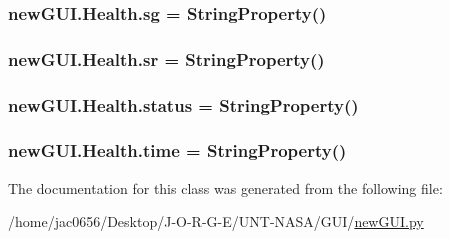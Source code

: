 \subsubsection[{\texorpdfstring{sg}{sg}}]{\setlength{\rightskip}{0pt plus 5cm}new\+G\+U\+I.\+Health.\+sg = String\+Property()\hspace{0.3cm}{\ttfamily [static]}}\hypertarget{classnewGUI_1_1Health_a2fbe00b219464fe2399a667b5007754b}{}\label{classnewGUI_1_1Health_a2fbe00b219464fe2399a667b5007754b}
\subsubsection[{\texorpdfstring{sr}{sr}}]{\setlength{\rightskip}{0pt plus 5cm}new\+G\+U\+I.\+Health.\+sr = String\+Property()\hspace{0.3cm}{\ttfamily [static]}}\hypertarget{classnewGUI_1_1Health_a65c3663c4c8d9cba367a6f44e93bf924}{}\label{classnewGUI_1_1Health_a65c3663c4c8d9cba367a6f44e93bf924}
\subsubsection[{\texorpdfstring{status}{status}}]{\setlength{\rightskip}{0pt plus 5cm}new\+G\+U\+I.\+Health.\+status = String\+Property()\hspace{0.3cm}{\ttfamily [static]}}\hypertarget{classnewGUI_1_1Health_aa449ef4c028f2046e2c0d124e6d0f2e6}{}\label{classnewGUI_1_1Health_aa449ef4c028f2046e2c0d124e6d0f2e6}
\subsubsection[{\texorpdfstring{time}{time}}]{\setlength{\rightskip}{0pt plus 5cm}new\+G\+U\+I.\+Health.\+time = String\+Property()\hspace{0.3cm}{\ttfamily [static]}}\hypertarget{classnewGUI_1_1Health_a93541d2a0ad79b7b74e07c738ede3e8e}{}\label{classnewGUI_1_1Health_a93541d2a0ad79b7b74e07c738ede3e8e}


The documentation for this class was generated from the following file\+:\begin{DoxyCompactItemize}
\item 
/home/jac0656/\+Desktop/\+J-\/\+O-\/\+R-\/\+G-\/\+E/\+U\+N\+T-\/\+N\+A\+S\+A/\+G\+U\+I/\hyperlink{newGUI_8py}{new\+G\+U\+I.\+py}\end{DoxyCompactItemize}
